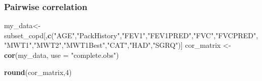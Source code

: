 \documentclass[
]{article}
\newenvironment{Shaded}{\begin{snugshade}}{\end{snugshade}}
\newcommand{\AttributeTok}[1]{\textcolor[rgb]{0.13,0.29,0.53}{#1}}
\newcommand{\DecValTok}[1]{\textcolor[rgb]{0.00,0.00,0.81}{#1}}
\newcommand{\FunctionTok}[1]{\textcolor[rgb]{0.13,0.29,0.53}{\textbf{#1}}}
\newcommand{\NormalTok}[1]{#1}
\newcommand{\OtherTok}[1]{\textcolor[rgb]{0.56,0.35,0.01}{#1}}
\newcommand{\StringTok}[1]{\textcolor[rgb]{0.31,0.60,0.02}{#1}}
\begin{document}
\subsubsection{Pairwise correlation}\label{pairwise-correlation}

\begin{Shaded}
\begin{Highlighting}[]
\NormalTok{my\_data}\OtherTok{\textless{}{-}}\NormalTok{subset\_copd[,}\FunctionTok{c}\NormalTok{(}\StringTok{"AGE"}\NormalTok{,}\StringTok{"PackHistory"}\NormalTok{,}\StringTok{"FEV1"}\NormalTok{,}\StringTok{"FEV1PRED"}\NormalTok{,}\StringTok{"FVC"}\NormalTok{,}\StringTok{"FVCPRED"}\NormalTok{,}\StringTok{"MWT1"}\NormalTok{,}\StringTok{"MWT2"}\NormalTok{,}\StringTok{"MWT1Best"}\NormalTok{,}\StringTok{"CAT"}\NormalTok{,}\StringTok{"HAD"}\NormalTok{,}\StringTok{"SGRQ"}\NormalTok{)]}
\NormalTok{cor\_matrix }\OtherTok{\textless{}{-}} \FunctionTok{cor}\NormalTok{(my\_data, }\AttributeTok{use =} \StringTok{"complete.obs"}\NormalTok{)}
\end{Highlighting}
\end{Shaded}

\begin{Shaded}
\begin{Highlighting}[]
\FunctionTok{round}\NormalTok{(cor\_matrix,}\DecValTok{4}\NormalTok{)}
\end{Highlighting}
\end{Shaded}
\end{document}
